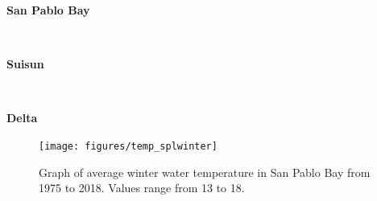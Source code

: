 \documentclass[
]{book}
\begin{document}
\begin{panel-grid}

\begin{columns-nocenter}

\begin{column800}

\textbf{San Pablo Bay}

\end{column800}

\begin{column40}

~

\end{column40}

\begin{column800}

\textbf{Suisun}

\end{column800}

\begin{column40}

~

\end{column40}

\begin{column800}

\textbf{Delta}

\end{column800}

\end{columns-nocenter}

\begin{columns-nocenter}

\begin{column800}

\begin{expand}

\begin{figure}
\texttt{[image: figures/temp\_splwinter]} \caption{Graph of average winter water temperature in San Pablo Bay from 1975 to 2018. Values range from 13 to 18.}\label{fig:unnamed-chunk-152}
\end{figure}

\end{expand}

\end{column800}

\begin{column40}

~

\end{column40}


\end{columns-nocenter}
\end{panel-grid}
\end{document}
